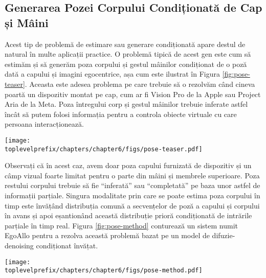 \documentclass[../../book-main_ro.tex]{subfiles}
\begin{document}
\subsection{Generarea Pozei Corpului Condiționată de Cap și Mâini}\label{sub:ego-allo}
Acest tip de
problemă de estimare sau generare condiționată apare destul de natural în multe
aplicații practice. 
O problemă tipică de acest gen este cum să estimăm și să generăm poza corpului și gestul mâinilor condiționat de o poză dată a capului și imagini egocentrice, așa cum este ilustrat în Figura \ref{fig:pose-teaser}. Aceasta este adesea problema pe care trebuie să o rezolvăm când cineva poartă un dispozitiv montat pe cap, cum ar fi Vision Pro de la Apple sau Project Aria de la Meta. Poza întregului corp și gestul mâinilor trebuie inferate astfel încât să putem folosi informația pentru a controla obiecte virtuale cu care persoana interacționează.
\begin{figure*}[t]
  \centering
  \texttt{[image: \\toplevelprefix/chapters/chapter6/figs/pose-teaser.pdf]}
    \caption{
Un sistem care estimează înălțimea, poza și parametrii mâinilor corpului uman (mijloc), condiționat de pozele SLAM egocentrice și imagini (stânga). Ieșirile captează acțiunile purtătorului în cadrul de referință alocentric al scenei, pe care îl vizualizăm aici cu reconstrucții 3D (dreapta).
  }
  \label{fig:pose-teaser}

\end{figure*}

Observați că în acest caz, avem doar poza capului furnizată de dispozitiv și un câmp vizual foarte limitat pentru o parte din mâini și membrele superioare. Poza restului corpului trebuie să fie ``inferată'' sau ``completată'' pe baza unor astfel de informații parțiale. Singura modalitate prin care se poate estima poza corpului în timp este învățând distribuția comună a secvențelor de poză a capului și corpului în avans și apoi eșantionând această distribuție prioră condiționată de intrările parțiale în timp real. Figura \ref{fig:pose-method} conturează un sistem numit EgoAllo \cite{yi2024egoallo} pentru a rezolva această problemă bazat pe un model de difuzie-denoising condiționat învățat.

\begin{figure*}[t]
  \centering
  \texttt{[image: \\toplevelprefix/chapters/chapter6/figs/pose-method.pdf]}
\caption{
    \textbf{Prezentare generală a componentelor tehnice ale EgoAllo \cite{yi2024egoallo}.}
    Un model de difuzie este pre-antrenat care poate genera secvențe de poză a corpului bazate pe parametri locali ai corpului (mijloc).
    O parametrizare invariantă $g(\cdot)$ a pozelor SLAM (stânga) este folosită pentru a condiționa modelul de difuzie. Acestea pot fi plasate în cadrul de coordonate global prin aliniere globală la pozele de intrare.
    Când sunt disponibile, videoclipurile egocentrice sunt folosite pentru detectarea mâinilor (stânga) prin HaMeR~\cite{pavlakos2023reconstructing}, care pot fi încorporate în eșantioane prin ghidare de gestul generat.
  }
  \label{fig:pose-method}
\end{figure*}
\end{document}
